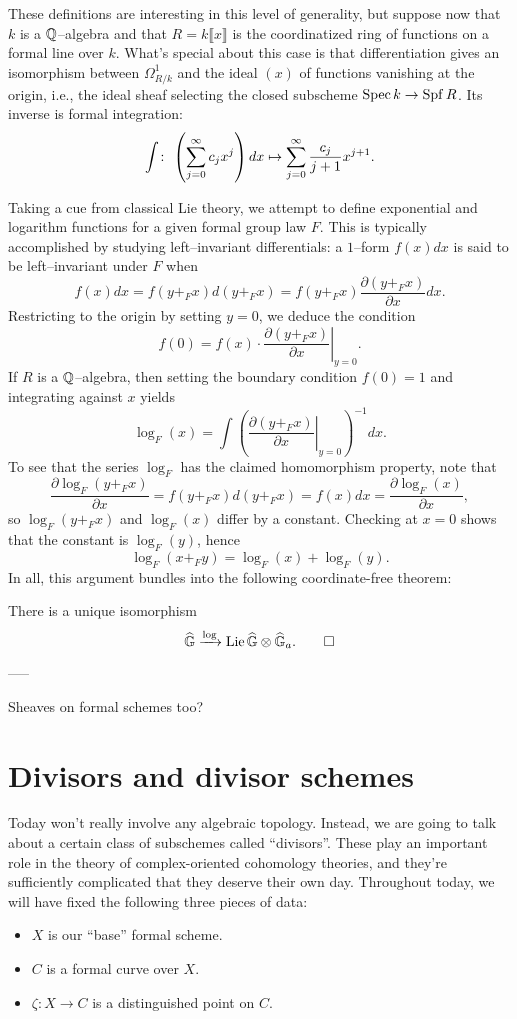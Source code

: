 These definitions are interesting in this level of generality, but suppose now that $k$ is a $\mathbb{Q}$--algebra and that $R = k\llbracket x \rrbracket$ is the coordinatized ring of functions on a formal line over $k$.  What's special about this case is that differentiation gives an isomorphism between $\Omega^1_{R/k}$ and the ideal $(x)$ of functions vanishing at the origin, i.e., the ideal sheaf selecting the closed subscheme $\operatorname{Spec} k \to \operatorname{Spf} R$.  Its inverse is formal integration: \[\int \colon\thinspace \left(\sum_{j=0}^\infty c_j x^j \right) dx \mapsto \sum_{j=0}^\infty \frac{c_j}{j+1} x^{j+1}.\]

Taking a cue from classical Lie theory, we attempt to define exponential and logarithm functions for a given formal group law $F$.  This is typically accomplished by studying left--invariant differentials: a $1$--form $f(x) dx$ is said to be left--invariant under $F$ when \[f(x) dx = f(y +_F x) d(y +_F x) = f(y +_F x) \frac{\partial(y +_F x)}{\partial x} dx.\]  Restricting to the origin by setting $y = 0$, we deduce the condition \[f(0) = f(x) \cdot \left. \frac{\partial(y +_F x)}{\partial x} \right|_{y=0}.\]  If $R$ is a $\mathbb{Q}$--algebra, then setting the boundary condition $f(0) = 1$ and integrating against $x$ yields \[\log_F(x) = \int \left( \left. \frac{\partial(y +_F x)}{\partial x} \right|_{y=0} \right)^{-1} dx.\]  To see that the series $\log_F$ has the claimed homomorphism property, note that \[\frac{\partial \log_F(y +_F x)}{\partial x} = f(y +_F x) d(y +_F x) = f(x) dx = \frac{\partial \log_F(x)}{\partial x},\] so $\log_F(y +_F x)$ and $\log_F(x)$ differ by a constant.  Checking at $x = 0$ shows that the constant is $\log_F(y)$, hence \[\log_F(x +_F y) = \log_F(x) + \log_F(y).\]  In all, this argument bundles into the following coordinate-free theorem:
\begin{theorem}\label{RationalFGLsHaveLogarithms}
There is a unique isomorphism \[\widehat{\mathbb G} \xrightarrow{\log} \operatorname{Lie} \widehat{\mathbb G} \otimes \widehat{\mathbb G}_a. \qed\]
\end{theorem}


-----

Sheaves on formal schemes too?





\section{Divisors and divisor schemes}

Today won't really involve any algebraic topology.  Instead, we are going to talk about a certain class of subschemes called ``divisors''.  These play an important role in the theory of complex-oriented cohomology theories, and they're sufficiently complicated that they deserve their own day.  Throughout today, we will have fixed the following three pieces of data:
\begin{itemize}
\item $X$ is our ``base'' formal scheme.
\item $C$ is a formal curve over $X$.
\item $\zeta: X \to C$ is a distinguished point on $C$.
\end{itemize}


